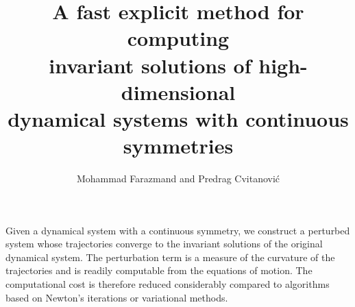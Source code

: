 \documentclass[11pt]{article}
\title{A fast explicit method for computing\\
       invariant solutions of
        high-dimensional \\
        dynamical systems with continuous symmetries}
\author{Mohammad Farazmand and Predrag Cvitanovi\'c}
\affil{School of Physics, Georgia Institute of Technology}
\date{}
\begin{document}
\maketitle
Given a dynamical system with a continuous symmetry, we construct a
perturbed system whose trajectories converge
to the invariant
solutions of the original dynamical system. The perturbation term is
a measure of the curvature of the trajectories and is readily computable from
the equations of motion. The computational cost is therefore reduced considerably
compared to algorithms based on Newton's iterations or variational methods.	
\end{document}
